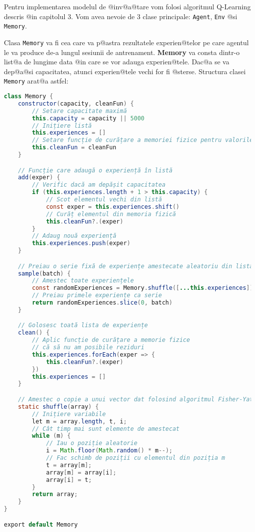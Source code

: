 Pentru implementarea modelul de @inv@a@tare vom folosi algoritmul Q-Learning descris @in capitolul 3. Vom avea nevoie de 3 clase principale: \texttt{Agent}, \texttt{Env} @si \texttt{Memory}.

Clasa \texttt{Memory} va fi cea care va p@astra rezultatele experien@telor pe care agentul le va produce de-a lungul sesiunii de antrenament. \textbf{Memory} va consta dintr-o list@a de lungime data @in care se vor adauga experien@tele. Dac@a se va dep@a@si capacitatea, atunci experien@tele vechi for fi @sterse. Structura clasei \texttt{Memory} arat@a astfel:

\begin{lstlisting}[language=Java, caption={Structura clasei Memory}]
class Memory {
    constructor(capacity, cleanFun) {
        // Setare capacitate maximă
        this.capacity = capacity || 5000
        // Inițiere listă
        this.experiences = []
        // Setare funcție de curățare a memoriei fizice pentru valorile care vor fi distruse
        this.cleanFun = cleanFun
    }

    // Funcție care adaugă o experiență în listă
    add(exper) {
        // Verific dacă am depășit capacitatea
        if (this.experiences.length + 1 > this.capacity) {
            // Scot elementul vechi din listă
            const exper = this.experiences.shift()
            // Curăț elementul din memoria fizică
            this.cleanFun?.(exper)
        }
        // Adaug nouă experiență
        this.experiences.push(exper)
    }

    // Preiau o serie fixă de experiențe amestecate aleatoriu din lista
    sample(batch) {
        // Amestec toate experiențele
        const randomExperiences = Memory.shuffle([...this.experiences])
        // Preiau primele experiențe ca serie
        return randomExperiences.slice(0, batch)
    }

    // Golosesc toată lista de experiențe
    clean() {
        // Aplic funcție de curățare a memorie fizice
        // că să nu am posibile reziduri
        this.experiences.forEach(exper => {
            this.cleanFun?.(exper)
        })
        this.experiences = []
    }

    // Amestec o copie a unui vector dat folosind algoritmul Fisher-Yates
    static shuffle(array) {
        // Inițiere variabile
        let m = array.length, t, i;
        // Cât timp mai sunt elemente de amestecat
        while (m) {
            // Iau o poziție aleatorie
            i = Math.floor(Math.random() * m--);
            // Fac schimb de poziții cu elementul din poziția m
            t = array[m];
            array[m] = array[i];
            array[i] = t;
        }
        return array;
    }
}

export default Memory
\end{lstlisting}


